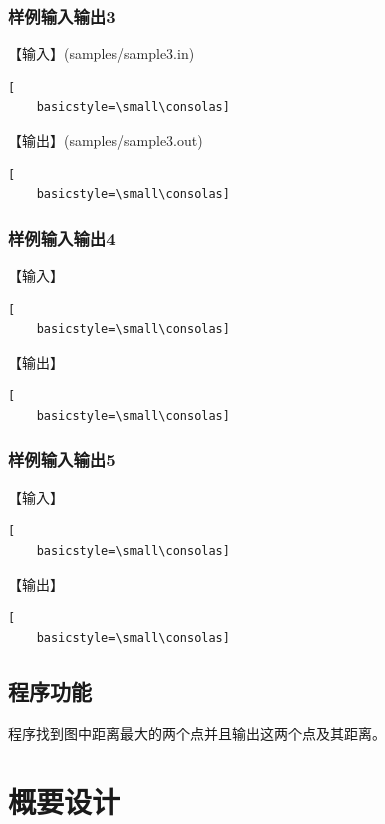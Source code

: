 \documentclass{article}
\begin{document}
\subsubsection{样例输入输出3}

【输入】(samples/sample3.in)

\begin{lstlisting}[
    basicstyle=\small\consolas]
\end{lstlisting}

【输出】(samples/sample3.out)

\begin{lstlisting}[
    basicstyle=\small\consolas]
\end{lstlisting}

\subsubsection{样例输入输出4}

【输入】

\begin{lstlisting}[
    basicstyle=\small\consolas]
\end{lstlisting}

【输出】

\begin{lstlisting}[
    basicstyle=\small\consolas]
\end{lstlisting}

\subsubsection{样例输入输出5}

【输入】

\begin{lstlisting}[
    basicstyle=\small\consolas]
\end{lstlisting}

【输出】

\begin{lstlisting}[
    basicstyle=\small\consolas]
\end{lstlisting}

\subsection{程序功能}

程序找到图中距离最大的两个点并且输出这两个点及其距离。

\section{概要设计}
\end{document}
